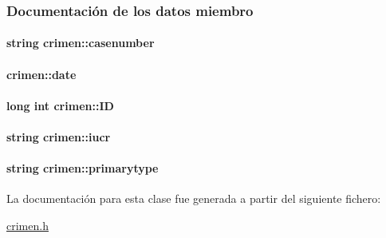\subsubsection{Documentación de los datos miembro}
\hypertarget{classcrimen_ad388e966532011945fcdb69cb29b74ff}{
\paragraph[{casenumber}]{\setlength{\rightskip}{0pt plus 5cm}string crimen\+::casenumber\hspace{0.3cm}{\ttfamily [private]}}}\label{classcrimen_ad388e966532011945fcdb69cb29b74ff}
\hypertarget{classcrimen_ab3ef462c5da98dbf03142c06e8c1a099}{
\paragraph[{date}]{ crimen\+::date\hspace{0.3cm}{\ttfamily [private]}}}\label{classcrimen_ab3ef462c5da98dbf03142c06e8c1a099}
\hypertarget{classcrimen_a59702f88f0b0c25781ae3d296790dcb8}{
\paragraph[{I\+D}]{\setlength{\rightskip}{0pt plus 5cm}long int crimen\+::\+I\+D\hspace{0.3cm}{\ttfamily [private]}}}\label{classcrimen_a59702f88f0b0c25781ae3d296790dcb8}
\hypertarget{classcrimen_a5699c8bd36d3cad23cff70cbd984f616}{
\paragraph[{iucr}]{\setlength{\rightskip}{0pt plus 5cm}string crimen\+::iucr\hspace{0.3cm}{\ttfamily [private]}}}\label{classcrimen_a5699c8bd36d3cad23cff70cbd984f616}
\hypertarget{classcrimen_a6d23454b3b810d0d9ff3245ab6bfbfbe}{
\paragraph[{primarytype}]{\setlength{\rightskip}{0pt plus 5cm}string crimen\+::primarytype\hspace{0.3cm}{\ttfamily [private]}}}\label{classcrimen_a6d23454b3b810d0d9ff3245ab6bfbfbe}


La documentación para esta clase fue generada a partir del siguiente fichero\+:\begin{DoxyCompactItemize}
\item 
\hyperlink{crimen_8h}{crimen.\+h}\end{DoxyCompactItemize}
